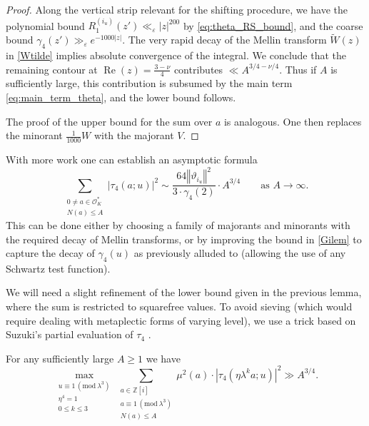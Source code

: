 \documentclass[12pt,reqno]{amsart}
\numberwithin{equation}{section}
\renewcommand{\Re}{\operatorname{Re}}
\renewcommand{\pmod}[1]{\, (\mathrm{mod}\ #1)}
\newcommand\norm[1]{\left\Vert {#1} \right\Vert}
\newcommand{\Z}{\mathbb{Z}}
\begin{document}
\begin{proof}
Along the vertical strip relevant for the shifting procedure, we have the polynomial bound $R_1^{(i_u)}(z')  \ll_\varepsilon |{z}|^{200}$ by \eqref{eq:theta_RS_bound}, and the coarse bound $\gamma_4(z') \gg_\varepsilon e^{-1000|{z}|}$. The very rapid decay of the Mellin transform $\widetilde{W}(z)$ in \eqref{Wtilde} implies absolute convergence of the integral. We conclude that the remaining contour at $\Re(z) = \frac{3-\nu}{4}$ contributes $\ll A^{3/4 - \nu/4}$. Thus if $A$ is sufficiently large, this contribution is subsumed by the main term \eqref{eq:main_term_theta}, and the lower bound follows.

    The proof of the upper bound for the sum over $a$ is analogous. One then replaces
    the minorant $\frac{1}{1000} W$ with the majorant $V$.
\end{proof}

\begin{remark}
    With more work one can establish an asymptotic formula
    \begin{equation*}
        \sum_{\substack{0 \neq a \in \mathcal{O}^*_K \\ N(a) \leq A}} |\tau_4(a ; u)|^2  \sim \frac{64 \norm{\vartheta_{i_u}}^2}{3 \cdot \gamma_4(2)} \cdot A^{3/4} \qquad \text{as } A \to \infty.
    \end{equation*}
    This can be done either by choosing a family of majorants and minorants with the required decay of Mellin transforms, or by improving the bound in \cref{Gilem} to capture the decay of $\gamma_4(u)$ as previously alluded to (allowing the use of any Schwartz test function).
\end{remark}

We will need a slight refinement of the lower bound given in the previous lemma, where the sum is restricted to squarefree values. To avoid sieving (which would require dealing with metaplectic forms of varying level), we use a trick based on Suzuki's partial evaluation of $\tau_4$ \cite{Suz1}.

\begin{lemma}\label{lemma:squarefree_tau_4}
    For any sufficiently large $A\geq 1$ we have
    \begin{equation*}
        \max_{\substack{u \equiv 1 \pmod{\lambda^3} \\ \eta^4 =1 \\ 0 \leq k \leq 3}} \sum_{\substack{a \in \Z[i] \\ a \equiv 1 \pmod{\lambda^3} \\ N(a) \leq A}} \mu^2(a) \cdot |\tau_4(\eta \lambda^k a ; u)|^2 \gg A^{3/4}.
    \end{equation*}
\end{lemma}
\end{document}
